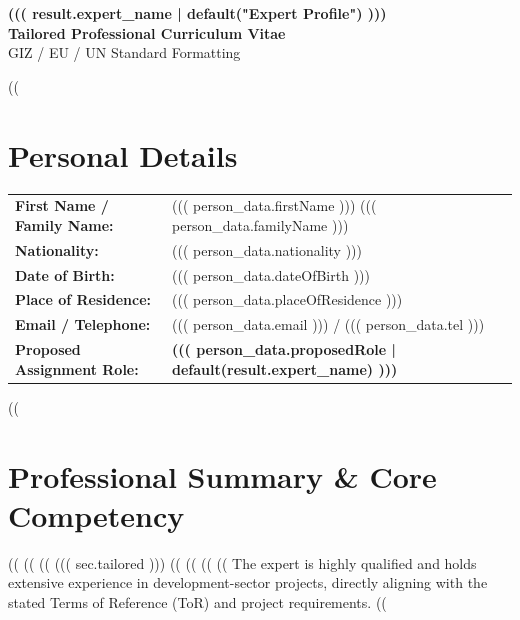 \documentclass[10pt,a4paper]{article}
\begin{document}
\pagestyle{empty}

\begin{center}
    {\Huge \textbf{((( result.expert_name | default("Expert Profile") )))}} \\
    \vspace{0.15cm}
    {\large \textbf{Tailored Professional Curriculum Vitae}} \\
    \vspace{0.1cm}
    \small GIZ / EU / UN Standard Formatting
\end{center}
\vspace{0.3cm}

((%
\section*{Personal Details}
\begin{tabular}{ll}
    \textbf{First Name / Family Name:} & ((( person_data.firstName ))) ((( person_data.familyName ))) \\
    \textbf{Nationality:} & ((( person_data.nationality ))) \\
    \textbf{Date of Birth:} & ((( person_data.dateOfBirth ))) \\
    \textbf{Place of Residence:} & ((( person_data.placeOfResidence ))) \\
    \textbf{Email / Telephone:} & ((( person_data.email ))) / ((( person_data.tel ))) \\
    \textbf{Proposed Assignment Role:} & \textbf{((( person_data.proposedRole | default(result.expert_name) )))}
\end{tabular}
\vspace{0.2cm}
((%

\section*{Professional Summary \& Core Competency}
((%
((%
    ((%
        ((( sec.tailored )))
        ((%
    ((%
((%
((%
The expert is highly qualified and holds extensive experience in development-sector projects, directly aligning with the stated Terms of Reference (ToR) and project requirements.
((%
\vspace{0.2cm}
\end{document}
